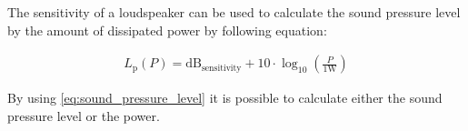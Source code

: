 The sensitivity of a loudspeaker can be used to calculate the sound pressure level by the amount of dissipated power by following equation:

\begin{align}\label{eq:sound_pressure_level}
L_\text{p}(P)=\text{dB}_\text{sensitivity} + 10\cdot \log_{10} \left(\frac{P}{1 \text{W}}\right)
\end{align} 

By using \autoref{eq:sound_pressure_level} it is possible to calculate either the sound pressure level or the power. %








